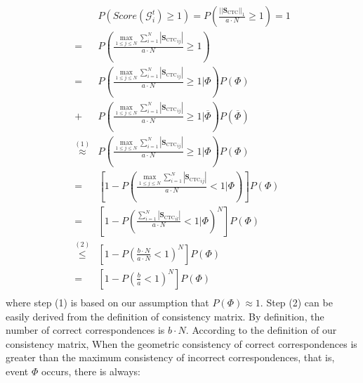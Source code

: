         \begin{equation}
       \begin{aligned} 
        &P(Score(\mathcal{G}^{t}_i)\geqslant1) = P(\frac{|| \mathbf{S}_{\mathrm{CTC}}||_1}{a\cdot N}\geqslant 1)=1 \\
        =& P(\frac{  \mathop{\max}\limits_{1\leqslant j \leqslant N} \sum_{i=1}^{N} |{\mathbf{S}_{\mathrm{CTC}}}_{ij}|   }{a\cdot N}\geqslant 1) \\
        =& P(\frac{  \mathop{\max}\limits_{1\leqslant j \leqslant N} \sum_{i=1}^{N} |{\mathbf{S}_{\mathrm{CTC}}}_{ij}|   }{a\cdot N}\geqslant 1 | \Phi) P(\Phi)\\
        +& P(\frac{  \mathop{\max}\limits_{1\leqslant j \leqslant N} \sum_{i=1}^{N} |{\mathbf{S}_{\mathrm{CTC}}}_{ij}|   }{a\cdot N}\geqslant 1 | \overline\Phi) P(\overline\Phi) \\
        \overset{(1)}{\approx}& P(\frac{  \mathop{\max}\limits_{1\leqslant j \leqslant N} \sum_{i=1}^{N} |{\mathbf{S}_{\mathrm{CTC}}}_{ij}|   }{a\cdot N}\geqslant 1 | \Phi) P(\Phi)\\
        =& \left[1- P(\frac{  \mathop{\max}\limits_{1\leqslant j \leqslant N} \sum_{i=1}^{N} |{\mathbf{S}_{\mathrm{CTC}}}_{ij}|   }{a\cdot N}< 1 | \Phi) \right]P(\Phi)\\
        =& \left[1- P(\frac{ \sum_{i=1}^{N} |{\mathbf{S}_{\mathrm{CTC}}}_{il}|   }{a\cdot N}< 1 | \Phi)^N \right]P(\Phi)\\
        \overset{(2)}{\leqslant }& \left[1- P(\frac{ b \cdot N   }{a\cdot N}< 1 )^N \right]P(\Phi)\\
        =& \left[1- P(\frac{b   }{a}< 1)^N \right]P(\Phi)\\
       \end{aligned} 
    \label{proof1}
    \end{equation}
where step (1) is based on our assumption that ${P}(\Phi)\approx  1 $. 
Step (2) can be easily derived 
from the definition of consistency matrix. By definition, the number of 
correct correspondences is $b\cdot N$. According to the definition of our consistency matrix, 
When the geometric consistency of correct correspondences is greater than the maximum consistency of incorrect correspondences, that is, event $\Phi$ occurs, there is always:
